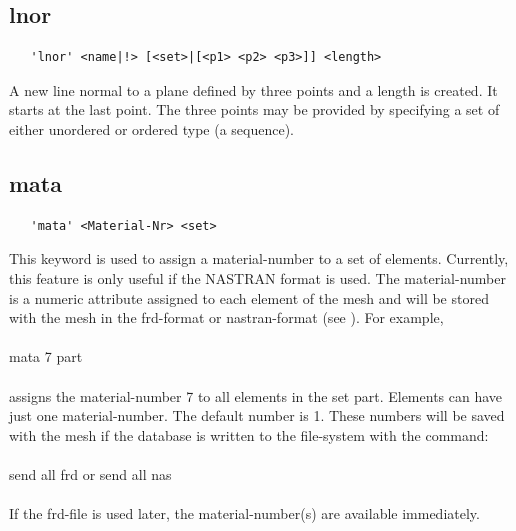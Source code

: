 \documentclass{article}
\begin{document}
\subsection{\label{lnor}lnor}
\begin{verbatim}
   'lnor' <name|!> [<set>|[<p1> <p2> <p3>]] <length> 
\end{verbatim}
A new line normal to a plane defined by three points and a length is created. It starts at the last point. The three points may be provided by specifying a set of either unordered or ordered type (a sequence).

\subsection{\label{mata}mata}
\begin{verbatim}
   'mata' <Material-Nr> <set> 
\end{verbatim}
This keyword is used to assign a material-number to a set of elements. Currently, this feature is only useful if the NASTRAN format is used. The material-number is a numeric attribute assigned to each element of the mesh and will be stored with the mesh in the frd-format or nastran-format (see ). For example,\\\\
mata 7 part\\\\
assigns the material-number 7 to all elements in the set part. Elements can have just one material-number. The default number is 1. These numbers will be saved with the mesh if the database is written to the file-system with the command:\\\\send all frd  or  send all nas\\\\If the frd-file is used later, the material-number(s) are available immediately.
\end{document}
